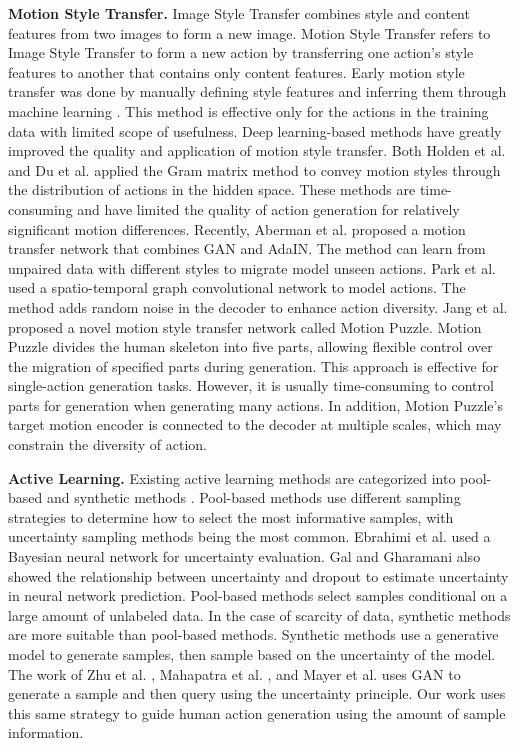 \textbf{Motion Style Transfer. }
Image Style Transfer \cite{gatys2016image, saito2020coco} combines style and content features from two images to form a new image. Motion Style Transfer refers to Image Style Transfer to form a new action by transferring one action's style features to another that contains only content features. Early motion style transfer was done by manually defining style features and inferring them through machine learning \cite{xia2015realtime, yumer2016spectral}. This method is effective only for the actions in the training data with limited scope of usefulness. 
Deep learning-based methods have greatly improved the quality and application of motion style transfer. Both Holden et al. \cite{2016A} and Du et al. \cite{du2019stylistic} applied the Gram matrix method to convey motion styles through the distribution of actions in the hidden space. These methods are time-consuming and have limited the quality of action generation for relatively significant motion differences.
Recently, Aberman et al. \cite{aberman2020unpaired} proposed a motion transfer network that combines GAN and AdaIN. 
The method can learn from unpaired data with different styles to migrate model unseen actions. 
Park et al. \cite{ParkSoomin2021Diverse} used a spatio-temporal graph convolutional network to model actions. The method adds random noise in the decoder to enhance action diversity. 
Jang et al. \cite{jang2022motion} proposed a novel motion style transfer network called Motion Puzzle. 
Motion Puzzle divides the human skeleton into five parts, allowing flexible control over the migration of specified parts during generation. This approach is effective for single-action generation tasks.
However, it is usually time-consuming to control parts for generation when generating many actions. In addition, Motion Puzzle's target motion encoder is connected to the decoder at multiple scales, which may constrain the diversity of action.

\textbf{Active Learning. }
Existing active learning methods are categorized into pool-based and synthetic methods \cite{gal2016dropout,beluch2018power,gorriz2017cost,yang2017suggestive,nguyen2004active}. Pool-based methods use different sampling strategies to determine how to select the most informative samples, with uncertainty sampling methods being the most common.
Ebrahimi et al. \cite{ebrahimi2019uncertainty} used a Bayesian neural network for uncertainty evaluation. Gal \cite{gal2016dropout} and Gharamani \cite{gal2017deep} also showed the relationship between uncertainty and dropout to estimate uncertainty in neural network prediction.
Pool-based methods select samples conditional on a large amount of unlabeled data. In the case of scarcity of data, synthetic methods are more suitable than pool-based methods. Synthetic methods use a generative model to generate samples, then sample based on the uncertainty of the model.
The work of Zhu et al.  \cite{zhu2017generative}, Mahapatra et al.  \cite{mahapatra2018efficient}, and Mayer et al. \cite{mayer2020adversarial} uses GAN to generate a sample and then query using the uncertainty principle. Our work uses this same strategy to guide human action generation using the amount of sample information.